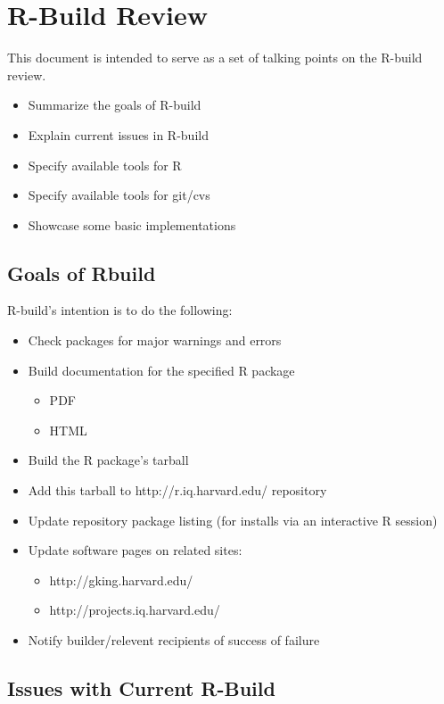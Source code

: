 \documentclass{article}
\begin{document}
\section{R-Build Review}

This document is intended to serve as a set of talking points on the
R-build review.

\begin{itemize}
\item
  Summarize the goals of R-build
\item
  Explain current issues in R-build
\item
  Specify available tools for R
\item
  Specify available tools for git/cvs
\item
  Showcase some basic implementations
\end{itemize}
\subsection{Goals of Rbuild}

R-build's intention is to do the following:

\begin{itemize}
\item
  Check packages for major warnings and errors
\item
  Build documentation for the specified R package
  \begin{itemize}
    \item
      PDF
    \item
      HTML
  \end{itemize}
\item
  Build the R package's tarball
\item
  Add this tarball to http://r.iq.harvard.edu/ repository
\item
  Update repository package listing (for installs via an interactive R
  session)
\item
  Update software pages on related sites:
  \begin{itemize}
    \item
      http://gking.harvard.edu/
    \item
      http://projects.iq.harvard.edu/
  \end{itemize}
\item
  Notify builder/relevent recipients of success of failure
\end{itemize}
\subsection{Issues with Current R-Build}
\end{document}
